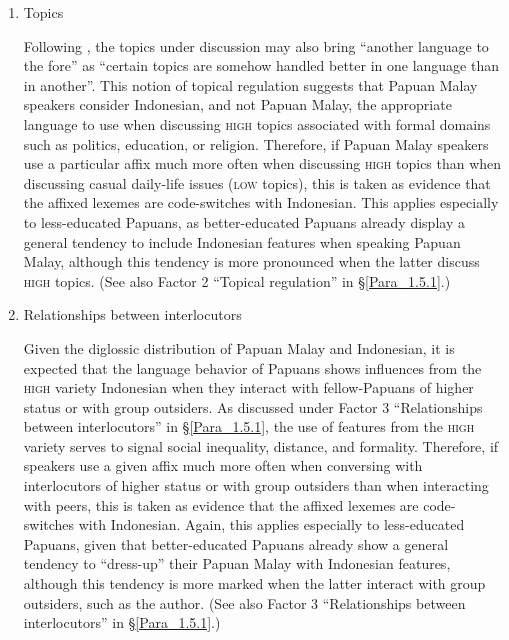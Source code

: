\begin{enumerate}
\begin{enumerate}
\item 
Topics\label{List_3.2.b}


Following {\citet[71]{Fishman.1965}}, the topics under discussion may also bring “another language to the fore” as “certain topics are somehow handled better in one language than in another”. This notion of topical regulation suggests that Papuan Malay speakers consider Indonesian, and not Papuan Malay, the appropriate language to use when discussing \textsc{high} topics associated with formal domains such as politics, education, or religion. Therefore, if Papuan Malay speakers use a particular affix much more often when discussing \textsc{high} topics than when discussing casual daily-life issues (\textsc{low} topics), this is taken as evidence that the affixed lexemes are code-switches with Indonesian. This applies especially to less-educated Papuans, as better-educated Papuans already display a general tendency to include Indonesian features when speaking Papuan Malay, although this tendency is more pronounced when the latter discuss \textsc{high} topics. (See also Factor 2 ``Topical regulation'' in §\ref{Para_1.5.1}.)


\item 
Relationships between interlocutors\label{List_3.2.c}

Given the diglossic distribution of Papuan Malay and Indonesian, it is expected that the language behavior of Papuans shows influences from the \textsc{high} variety Indonesian when they interact with fellow-Papuans of higher status or with group outsiders. As discussed under Factor 3 ``Relationships between interlocutors'' in §\ref{Para_1.5.1}, the use of features from the \textsc{high} variety serves to signal social inequality, distance, and formality. Therefore, if speakers use a given affix much more often when conversing with interlocutors of higher status or with group outsiders than when interacting with peers, this is taken as evidence that the affixed lexemes are code-switches with Indonesian. Again, this applies especially to less-educated Papuans, given that better-educated Papuans already show a general tendency to “dress-up” their Papuan Malay with Indonesian features, although this tendency is more marked when the latter interact with group outsiders, such as the author. (See also Factor 3 ``Relationships between interlocutors'' in §\ref{Para_1.5.1}.)

\end{enumerate}
\end{enumerate}

